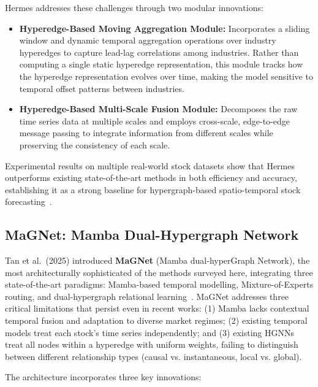 \documentclass[a4paper,11pt]{report}
\begin{document}
Hermes addresses these challenges through two modular innovations:

\begin{itemize}
    \item \textbf{Hyperedge-Based Moving Aggregation Module:} Incorporates a sliding window and dynamic temporal aggregation operations over industry hyperedges to capture lead-lag correlations among industries. Rather than computing a single static hyperedge representation, this module tracks how the hyperedge representation evolves over time, making the model sensitive to temporal offset patterns between industries.
    \item \textbf{Hyperedge-Based Multi-Scale Fusion Module:} Decomposes the raw time series data at multiple scales and employs cross-scale, edge-to-edge message passing to integrate information from different scales while preserving the consistency of each scale.
\end{itemize}

Experimental results on multiple real-world stock datasets show that Hermes outperforms existing state-of-the-art methods in both efficiency and accuracy, establishing it as a strong baseline for hypergraph-based spatio-temporal stock forecasting~\cite{qiu2025hermes}.

\subsection{MaGNet: Mamba Dual-Hypergraph Network}

Tan et al.\ (2025) introduced \textbf{MaGNet} (Mamba dual-hyperGraph Network), the most architecturally sophisticated of the methods surveyed here, integrating three state-of-the-art paradigms: Mamba-based temporal modelling, Mixture-of-Experts routing, and dual-hypergraph relational learning~\cite{tan2025magnet}. MaGNet addresses three critical limitations that persist even in recent works: (1) Mamba lacks contextual temporal fusion and adaptation to diverse market regimes; (2) existing temporal models treat each stock's time series independently; and (3) existing HGNNs treat all nodes within a hyperedge with uniform weights, failing to distinguish between different relationship types (causal vs. instantaneous, local vs. global).

The architecture incorporates three key innovations:
\end{document}
